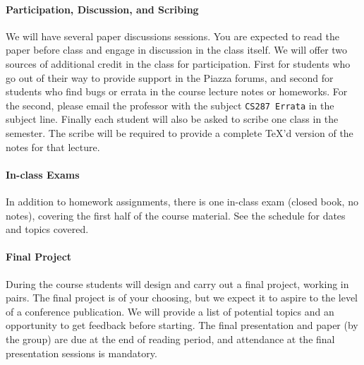 \documentclass[11pt]{article}
\begin{document}


\paragraph{Participation, Discussion, and Scribing}

We will have several paper discussions sessions. You are expected to
read the paper before class and engage in discussion in the class
itself.  We will offer two sources of additional credit in the class
for participation. First for students who go out of their way to
provide support in the Piazza forums, and second for students who find
bugs or errata in the course lecture notes or homeworks. For the
second, please email the professor with the subject \texttt{CS287
  Errata} in the subject line. Finally each student will also be asked
to scribe one class in the semester. The scribe will be required to
provide a complete TeX'd version of the notes for that lecture.


\paragraph{In-class Exams}

In addition to homework assignments, there is one in-class exam
(closed book, no notes), covering the first half of the course
material. See the schedule for dates and topics covered. 

\paragraph{Final Project}

During the course students will design and carry out a final project,
working in pairs. The final project is of your choosing, but we expect
it to aspire to the level of a conference publication. We will provide
a list of potential topics and an opportunity to get feedback before
starting. The final presentation and paper (by the group)
are due at the end of reading period, and attendance at the final
presentation sessions is mandatory.
\end{document}
